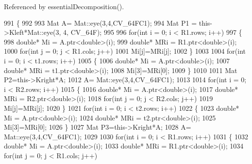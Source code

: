 Referenced by essential\+Decomposition().


\begin{DoxyCode}
991                                                                                                            
                                 \{
992 
993         Mat A= Mat::eye(3,4,CV\_64FC1);
994         Mat P1 = this->Kleft*Mat::eye(3, 4, CV\_64F);
995 
996         \textcolor{keywordflow}{for}(\textcolor{keywordtype}{int} i = 0; i < R1.rows; i++)
997          \{
998              \textcolor{keywordtype}{double}* Mi = A.ptr<\textcolor{keywordtype}{double}>(i);
999              \textcolor{keywordtype}{double}* MRi = R1.ptr<\textcolor{keywordtype}{double}>(i);
1000                 \textcolor{keywordflow}{for}(\textcolor{keywordtype}{int} j = 0; j < R1.cols; j++)
1001                      Mi[j]=MRi[j];
1002          \}
1003          
1004         \textcolor{keywordflow}{for}(\textcolor{keywordtype}{int} i = 0; i < t1.rows; i++)
1005          \{
1006              \textcolor{keywordtype}{double}* Mi = A.ptr<\textcolor{keywordtype}{double}>(i);
1007              \textcolor{keywordtype}{double}* MRi = t1.ptr<\textcolor{keywordtype}{double}>(i);
1008              Mi[3]=MRi[0];
1009          \}
1010 
1011         Mat P2=this->Kright*A;
1012         A= Mat::eye(3,4,CV\_64FC1);
1013         
1014         \textcolor{keywordflow}{for}(\textcolor{keywordtype}{int} i = 0; i < R2.rows; i++)
1015          \{
1016              \textcolor{keywordtype}{double}* Mi = A.ptr<\textcolor{keywordtype}{double}>(i);
1017              \textcolor{keywordtype}{double}* MRi = R2.ptr<\textcolor{keywordtype}{double}>(i);
1018                 \textcolor{keywordflow}{for}(\textcolor{keywordtype}{int} j = 0; j < R2.cols; j++)
1019                      Mi[j]=MRi[j];
1020          \}
1021         \textcolor{keywordflow}{for}(\textcolor{keywordtype}{int} i = 0; i < t2.rows; i++)
1022          \{
1023              \textcolor{keywordtype}{double}* Mi = A.ptr<\textcolor{keywordtype}{double}>(i);
1024              \textcolor{keywordtype}{double}* MRi = t2.ptr<\textcolor{keywordtype}{double}>(i);
1025              Mi[3]=MRi[0];
1026          \}
1027         Mat P3=this->Kright*A;
1028         A= Mat::eye(3,4,CV\_64FC1);
1029 
1030         \textcolor{keywordflow}{for}(\textcolor{keywordtype}{int} i = 0; i < R1.rows; i++)
1031          \{
1032              \textcolor{keywordtype}{double}* Mi = A.ptr<\textcolor{keywordtype}{double}>(i);
1033              \textcolor{keywordtype}{double}* MRi = R1.ptr<\textcolor{keywordtype}{double}>(i);
1034              \textcolor{keywordflow}{for}(\textcolor{keywordtype}{int} j = 0; j < R1.cols; j++)

\end{DoxyCode}
